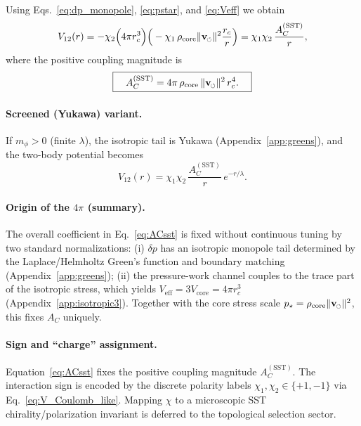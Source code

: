 \documentclass[pdflatex,sn-mathphys-num]{revtex4-2}
\newcommand{\swirlarrow}{\mathchoice{\mkern-2mu\scriptstyle\boldsymbol{\circlearrowleft}}{\mkern-2mu\scriptstyle\boldsymbol{\circlearrowleft}}{\mkern-2mu\scriptscriptstyle\boldsymbol{\circlearrowleft}}{\mkern-2mu\scriptscriptstyle\boldsymbol{\circlearrowleft}}}
\newcommand{\rhocore}{\rho_{\text{core}}}
\newcommand{\vswirl}{\mathbf{v}_{\swirlarrow}}
\newcommand{\vnorm}{\lVert \vswirl \rVert}
\providecommand{\rc}{r_c}
\begin{document}
        Using Eqs.~\eqref{eq:dp_monopole}, \eqref{eq:pstar}, and \eqref{eq:Veff} we obtain
        \begin{equation}
            V_{12}(r)
            =
            -\chi_2\Big(4\pi \rc^3\Big)\Big(-\chi_1\,\rhocore\vnorm^2\frac{\rc}{r}\Big)
            =
            \chi_1\chi_2\,\frac{A_C^{\mathrm{(SST)}}}{r},
            \label{eq:V_Coulomb_like}
        \end{equation}
        where the positive coupling magnitude is
        \begin{equation}
            \boxed{\quad A_C^{\mathrm{(SST)}} = 4\pi\,\rhocore\,\vnorm^2\,\rc^4.\quad}
            \label{eq:ACsst}
        \end{equation}

    \paragraph{Screened (Yukawa) variant.}
        If \(m_\phi>0\) (finite \(\lambda\)), the isotropic tail is Yukawa (Appendix~\ref{app:greens}), and the two-body
        potential becomes
        \begin{equation}
            V_{12}(r)=\chi_1\chi_2\,\frac{A_C^{\mathrm{(SST)}}}{r}\,e^{-r/\lambda}.
        \end{equation}

    \paragraph{Origin of the \(4\pi\) (summary).}
        The overall coefficient in Eq.~\eqref{eq:ACsst} is fixed without continuous tuning by two standard normalizations:
        (i) \(\delta p\) has an isotropic monopole tail determined by the Laplace/Helmholtz Green's function and boundary matching
        (Appendix~\ref{app:greens}); (ii) the pressure-work channel couples to the trace part of the isotropic stress,
        which yields \(V_{\mathrm{eff}}=3V_{\mathrm{core}}=4\pi \rc^3\) (Appendix~\ref{app:isotropic3}).
        Together with the core stress scale \(p_\star=\rhocore\vnorm^2\), this fixes \(A_C\) uniquely.

        \paragraph{Sign and ``charge'' assignment.}
        Equation~\eqref{eq:ACsst} fixes the positive coupling magnitude \(A_C^{\mathrm{(SST)}}\).
        The interaction sign is encoded by the discrete polarity labels \(\chi_1,\chi_2\in\{+1,-1\}\) via
        Eq.~\eqref{eq:V_Coulomb_like}. Mapping \(\chi\) to a microscopic SST chirality/polarization invariant is deferred to the
        topological selection sector.
\end{document}
